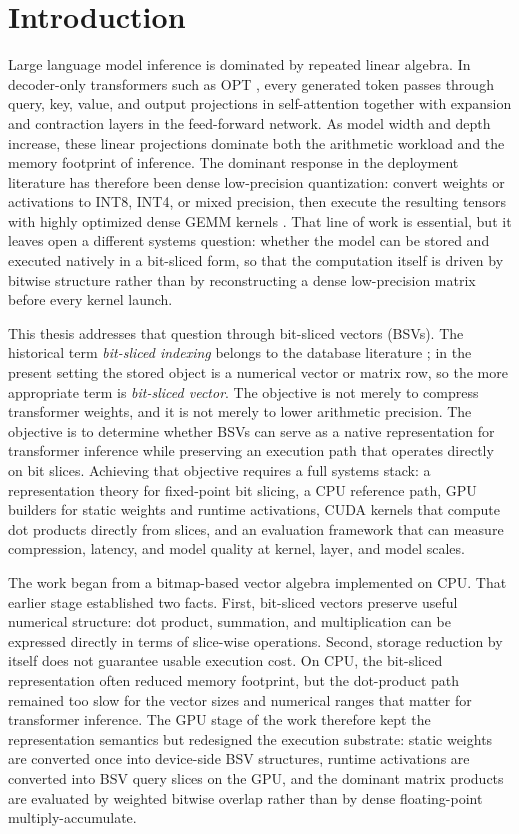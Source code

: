 \section{Introduction}\label{sec:introduction}
Large language model inference is dominated by repeated linear algebra. In decoder-only transformers such as OPT \cite{opt}, every generated token passes through query, key, value, and output projections in self-attention together with expansion and contraction layers in the feed-forward network. As model width and depth increase, these linear projections dominate both the arithmetic workload and the memory footprint of inference. The dominant response in the deployment literature has therefore been dense low-precision quantization: convert weights or activations to INT8, INT4, or mixed precision, then execute the resulting tensors with highly optimized dense GEMM kernels \cite{jacob2018quantization,llmint8,zeroquant,gptq,awq,smoothquant}. That line of work is essential, but it leaves open a different systems question: whether the model can be stored and executed natively in a bit-sliced form, so that the computation itself is driven by bitwise structure rather than by reconstructing a dense low-precision matrix before every kernel launch.

This thesis addresses that question through bit-sliced vectors (BSVs). The historical term \emph{bit-sliced indexing} belongs to the database literature \cite{oneil1997variant,rinfret2001bsi}; in the present setting the stored object is a numerical vector or matrix row, so the more appropriate term is \emph{bit-sliced vector}. The objective is not merely to compress transformer weights, and it is not merely to lower arithmetic precision. The objective is to determine whether BSVs can serve as a native representation for transformer inference while preserving an execution path that operates directly on bit slices. Achieving that objective requires a full systems stack: a representation theory for fixed-point bit slicing, a CPU reference path, GPU builders for static weights and runtime activations, CUDA kernels that compute dot products directly from slices, and an evaluation framework that can measure compression, latency, and model quality at kernel, layer, and model scales.

The work began from a bitmap-based vector algebra implemented on CPU. That earlier stage established two facts. First, bit-sliced vectors preserve useful numerical structure: dot product, summation, and multiplication can be expressed directly in terms of slice-wise operations. Second, storage reduction by itself does not guarantee usable execution cost. On CPU, the bit-sliced representation often reduced memory footprint, but the dot-product path remained too slow for the vector sizes and numerical ranges that matter for transformer inference. The GPU stage of the work therefore kept the representation semantics but redesigned the execution substrate: static weights are converted once into device-side BSV structures, runtime activations are converted into BSV query slices on the GPU, and the dominant matrix products are evaluated by weighted bitwise overlap rather than by dense floating-point multiply-accumulate.

